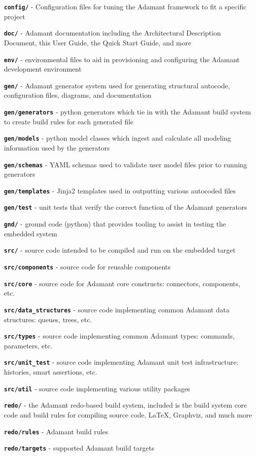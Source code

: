 \vspace{5mm} %
\begin{spaceditemize}
  \item \textbf{\texttt{config/}} - Configuration files for tuning the Adamant framework to fit a specific project
  \item \textbf{\texttt{doc/}} - Adamant documentation including the Architectural Description Document, this User Guide, the Quick Start Guide, and more
  \item \textbf{\texttt{env/}} - environmental files to aid in provisioning and configuring the Adamant development environment
  \item \textbf{\texttt{gen/}} - Adamant generator system used for generating structural autocode, configuration files, diagrams, and documentation 
  \item \textbf{\texttt{gen/generators}} - python generators which tie in with the Adamant build system to create build rules for each generated file
  \item \textbf{\texttt{gen/models}} - python model classes which ingest and calculate all modeling information used by the generators
  \item \textbf{\texttt{gen/schemas}} - YAML schemas used to validate user model files prior to running generators 
  \item \textbf{\texttt{gen/templates}} - Jinja2 templates used in outputting various autocoded files
  \item \textbf{\texttt{gen/test}} - unit tests that verify the correct function of the Adamant generators
  \item \textbf{\texttt{gnd/}} - ground code (python) that provides tooling to assist in testing the embedded system
  \item \textbf{\texttt{src/}} - source code intended to be compiled and run on the embedded target
  \item \textbf{\texttt{src/components}} - source code for reusable components
  \item \textbf{\texttt{src/core}} - source code for Adamant core constructs: connectors, components, etc.
  \item \textbf{\texttt{src/data\_structures}} - source code implementing common Adamant data structures: queues, trees, etc.
  \item \textbf{\texttt{src/types}} - source code implementing common Adamant types: commands, parameters, etc.
  \item \textbf{\texttt{src/unit\_test}} - source code implementing Adamant unit test infrastructure: histories, smart assertions, etc.
  \item \textbf{\texttt{src/util}} - source code implementing various utility packages
  \item \textbf{\texttt{redo/}} - the Adamant redo-based build system, included is the build system core code and build rules for compiling source code, \LaTeX, Graphviz, and much more
  \item \textbf{\texttt{redo/rules}} - Adamant build rules
  \item \textbf{\texttt{redo/targets}} - supported Adamant build targets
\end{spaceditemize}
